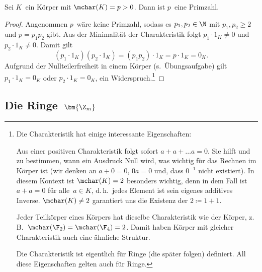\documentclass[a4paper]{article}
\begin{document}
\begin{lemma}\label{lem:primechar}
    Sei $K$~ein Körper mit $\mchar(K) = p > 0$. Dann ist $p$~eine Primzahl.
\end{lemma}

\begin{proof}
    Angenommen $p$~wäre keine Primzahl, sodass es $p_1, p_2 \in \N$ mit $p_1, p_2 \geq 2$ und $p = p_1p_2$ gibt. Aus der Minimalität der Charakteristik folgt $p_1 \cdot 1_K \neq 0$ und $p_2 \cdot 1_K \neq 0$. Damit gilt
    \begin{equation*}
        (p_1 \cdot 1_K) (p_2 \cdot 1_K) = (p_1p_2) \cdot 1_K = p \cdot 1_K = 0_K.
    \end{equation*}
    Aufgrund der Nullteilerfreiheit in einem Körper (s.~Übungsaufgabe) gilt $p_1 \cdot 1_K = 0_K$ oder $p_2 \cdot 1_K = 0_K$, ein Widerspruch.\footnote{Die Charakteristik hat einige interessante Eigenschaften:

        Aus einer positiven Charakteristik folgt sofort $a + a + \dots a = 0$. Sie hilft und zu bestimmen, wann ein Ausdruck Null wird, was wichtig für das Rechnen im Körper ist (wir denken an $a+0 = 0$, $0a = 0$ und, dass $0^{-1}$ nicht existiert). In diesem Kontext ist $\mchar(K) = 2$ besonders wichtig, denn in dem Fall ist $a + a = 0$ für alle~$a \in K$, d.\,h.\ jedes Element ist sein eigenes additives Inverse. $\mchar(K) \neq 2$ garantiert uns die Existenz der $2 \coloneqq 1+1$.

        Jeder Teilkörper eines Körpers hat dieselbe Charakteristik wie der Körper, z.\,B.\ $\mchar(\F_2) = \mchar(\F_4) = 2$. Damit haben Körper mit gleicher Charakteristik auch eine ähnliche Struktur.

        Die Charakteristik ist eigentlich für Ringe (die später folgen) definiert. All diese Eigenschaften gelten auch für Ringe.}
\end{proof}


\subsection{Die Ringe~\texorpdfstring{$\bm{\Z_m}$}{Zm}}
\end{document}
